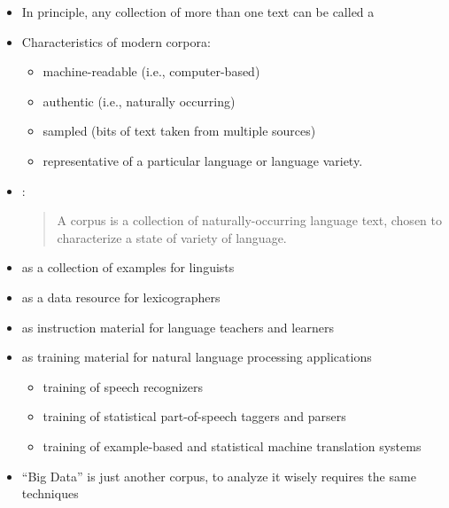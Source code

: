 \documentclass[a4paper,landscape,headrule,footrule]{foils}
\begin{document}
\begin{itemize}
\item  In principle, any collection of more than one text can be called a
\item  Characteristics of modern corpora:
  \begin{itemize}
  \item machine-readable (i.e., computer-based)
  \item authentic (i.e., naturally occurring)
  \item sampled (bits of text taken from multiple sources)
  \item representative of a particular language or language variety.
  \end{itemize}
\item  \citet[171]{Sinclair:1991}:
  \begin{quote}
    A corpus is a collection of naturally-occurring language text, chosen to characterize a state of variety of language.
\end{quote}
\end{itemize}


\begin{itemize}
\item as a collection of examples for linguists
\item as a data resource for lexicographers
\item as instruction material for language teachers and learners
\item as training material for natural language processing applications
  \begin{itemize}
  \item training of speech recognizers
  \item training of statistical part-of-speech taggers and parsers
  \item training of example-based and statistical machine translation systems
  \end{itemize}
\item ``Big Data'' is just another corpus, to analyze it wisely
  requires the same techniques

\end{itemize}



\end{document}
